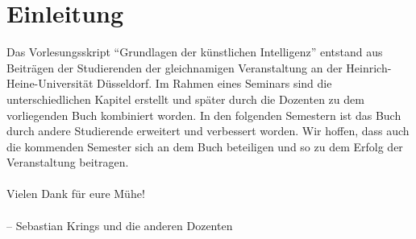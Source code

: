 
\chapter{Einleitung}
Das Vorlesungsskript \enquote{Grundlagen der künstlichen Intelligenz} entstand aus Beiträgen der Studierenden der gleichnamigen Veranstaltung an der Heinrich-Heine-Universität Düsseldorf. Im Rahmen eines Seminars sind die unterschiedlichen Kapitel erstellt und später durch die Dozenten zu dem vorliegenden Buch kombiniert worden.
In den folgenden Semestern ist das Buch durch andere Studierende erweitert und verbessert worden. Wir hoffen, dass auch die kommenden Semester sich an dem Buch beteiligen und so zu dem Erfolg der Veranstaltung beitragen.
\\\\
Vielen Dank für eure Mühe!
\\\\
-- Sebastian Krings und die anderen Dozenten